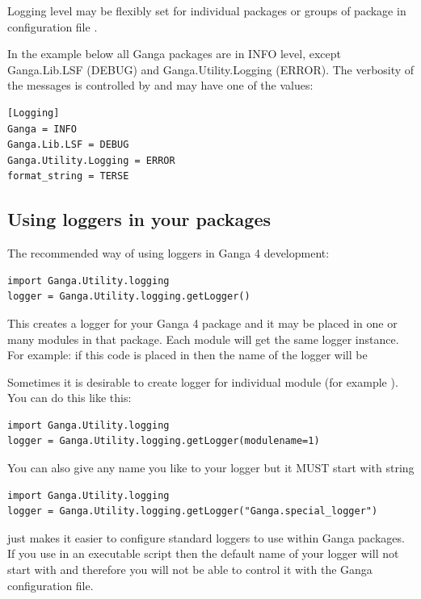 \documentclass{howto}
\begin{document}
Logging level may be flexibly set for individual packages or groups of
package in configuration file .

In  the example below  all Ganga  packages are  in INFO  level, except
Ganga.Lib.LSF   (DEBUG)   and   Ganga.Utility.Logging  (ERROR).    The
verbosity of  the messages  is controlled by   and
may have one of the values: 

\begin{verbatim}
[Logging]
Ganga = INFO
Ganga.Lib.LSF = DEBUG
Ganga.Utility.Logging = ERROR
format_string = TERSE
\end{verbatim}

\subsection{Using loggers in your packages}

The recommended way of using loggers in Ganga 4 development:
\begin{verbatim}
import Ganga.Utility.logging
logger = Ganga.Utility.logging.getLogger()
\end{verbatim}

This creates a logger for your Ganga 4 package and it may be placed in
one or  many modules in  that package. Each  module will get  the same
logger   instance.  For   example:   if  this   code   is  placed   in
 then  the name of the  logger will be

Sometimes it is desirable to  create logger for individual module (for
example ). You can do this like this:
\begin{verbatim}
import Ganga.Utility.logging
logger = Ganga.Utility.logging.getLogger(modulename=1)
\end{verbatim}

You can also give any name you like to your logger but it MUST start with string 
\begin{verbatim}
import Ganga.Utility.logging
logger = Ganga.Utility.logging.getLogger("Ganga.special_logger")
\end{verbatim}

\begin{notice}

  just   makes  it  easier   to  configure
standard  loggers   to  use  within   Ganga  packages.   If   you  use
 in an  executable script then the default
name of your logger will  not start with  and therefore
you will not be able to control it with the Ganga configuration file.

\end{notice}
\end{document}
